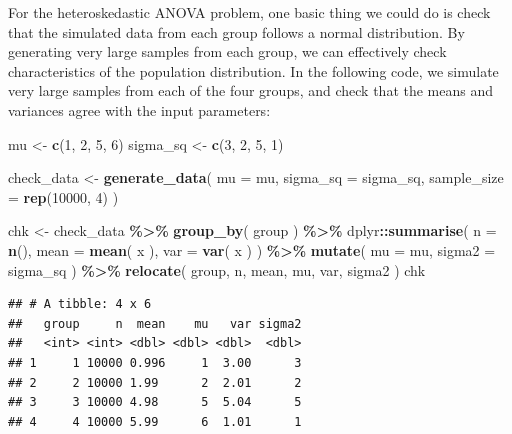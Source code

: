 \documentclass[
]{book}
\newenvironment{Shaded}{\begin{snugshade}}{\end{snugshade}}
\newcommand{\AttributeTok}[1]{\textcolor[rgb]{0.13,0.29,0.53}{#1}}
\newcommand{\DecValTok}[1]{\textcolor[rgb]{0.00,0.00,0.81}{#1}}
\newcommand{\FunctionTok}[1]{\textcolor[rgb]{0.13,0.29,0.53}{\textbf{#1}}}
\newcommand{\NormalTok}[1]{#1}
\newcommand{\OtherTok}[1]{\textcolor[rgb]{0.56,0.35,0.01}{#1}}
\newcommand{\SpecialCharTok}[1]{\textcolor[rgb]{0.81,0.36,0.00}{\textbf{#1}}}
\begin{document}
For the heteroskedastic ANOVA problem, one basic thing we could do is check that the simulated data from each group follows a normal distribution. By generating very large samples from each group, we can effectively check characteristics of the population distribution.
In the following code, we simulate very large samples from each of the four groups, and check that the means and variances agree with the input parameters:

\begin{Shaded}
\begin{Highlighting}[]
\NormalTok{mu }\OtherTok{\textless{}{-}} \FunctionTok{c}\NormalTok{(}\DecValTok{1}\NormalTok{, }\DecValTok{2}\NormalTok{, }\DecValTok{5}\NormalTok{, }\DecValTok{6}\NormalTok{)}
\NormalTok{sigma\_sq }\OtherTok{\textless{}{-}} \FunctionTok{c}\NormalTok{(}\DecValTok{3}\NormalTok{, }\DecValTok{2}\NormalTok{, }\DecValTok{5}\NormalTok{, }\DecValTok{1}\NormalTok{)}

\NormalTok{check\_data }\OtherTok{\textless{}{-}} \FunctionTok{generate\_data}\NormalTok{( }\AttributeTok{mu =}\NormalTok{ mu, }\AttributeTok{sigma\_sq =}\NormalTok{ sigma\_sq,}
                             \AttributeTok{sample\_size =} \FunctionTok{rep}\NormalTok{(}\DecValTok{10000}\NormalTok{, }\DecValTok{4}\NormalTok{) )}

\NormalTok{chk }\OtherTok{\textless{}{-}}\NormalTok{ check\_data }\SpecialCharTok{\%\textgreater{}\%} \FunctionTok{group\_by}\NormalTok{( group ) }\SpecialCharTok{\%\textgreater{}\%}
\NormalTok{  dplyr}\SpecialCharTok{::}\FunctionTok{summarise}\NormalTok{( }\AttributeTok{n =} \FunctionTok{n}\NormalTok{(),}
                    \AttributeTok{mean =} \FunctionTok{mean}\NormalTok{( x ),}
                    \AttributeTok{var =} \FunctionTok{var}\NormalTok{( x ) ) }\SpecialCharTok{\%\textgreater{}\%}
  \FunctionTok{mutate}\NormalTok{( }\AttributeTok{mu =}\NormalTok{ mu,}
          \AttributeTok{sigma2 =}\NormalTok{ sigma\_sq ) }\SpecialCharTok{\%\textgreater{}\%}
  \FunctionTok{relocate}\NormalTok{( group, n, mean, mu, var, sigma2 )}
\NormalTok{chk}
\end{Highlighting}
\end{Shaded}

\begin{verbatim}
## # A tibble: 4 x 6
##   group     n  mean    mu   var sigma2
##   <int> <int> <dbl> <dbl> <dbl>  <dbl>
## 1     1 10000 0.996     1  3.00      3
## 2     2 10000 1.99      2  2.01      2
## 3     3 10000 4.98      5  5.04      5
## 4     4 10000 5.99      6  1.01      1
\end{verbatim}
\end{document}
